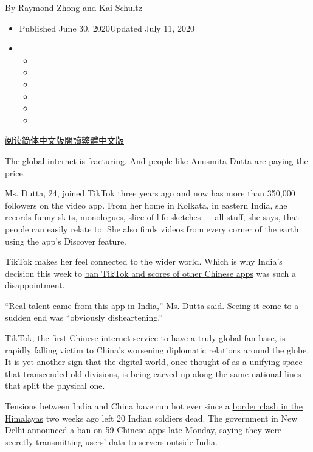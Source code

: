 By \href{https://www.nytimes.com/by/raymond-zhong}{Raymond Zhong} and
\href{https://www.nytimes.com/by/kai-schultz}{Kai Schultz}

\begin{itemize}
\item
  Published June 30, 2020Updated July 11, 2020
\item
  \begin{itemize}
  \item
  \item
  \item
  \item
  \item
  \item
  \end{itemize}
\end{itemize}

\href{https://cn.nytimes.com/technology/20200701/india-china-tiktok/}{阅读简体中文版}\href{https://cn.nytimes.com/technology/20200701/india-china-tiktok/zh-hant/}{閱讀繁體中文版}

The global internet is fracturing. And people like Anusmita Dutta are
paying the price.

Ms. Dutta, 24, joined TikTok three years ago and now has more than
350,000 followers on the video app. From her home in Kolkata, in eastern
India, she records funny skits, monologues, slice-of-life sketches ---
all stuff, she says, that people can easily relate to. She also finds
videos from every corner of the earth using the app's Discover feature.

TikTok makes her feel connected to the wider world. Which is why India's
decision this week to
\href{https://www.nytimes.com/2020/06/29/world/asia/tik-tok-banned-india-china.html}{ban
TikTok and scores of other Chinese apps} was such a disappointment.

``Real talent came from this app in India,'' Ms. Dutta said. Seeing it
come to a sudden end was ``obviously disheartening.''

TikTok, the first Chinese internet service to have a truly global fan
base, is rapidly falling victim to China's worsening diplomatic
relations around the globe. It is yet another sign that the digital
world, once thought of as a unifying space that transcended old
divisions, is being carved up along the same national lines that split
the physical one.

Tensions between India and China have run hot ever since a
\href{https://www.nytimes.com/2020/06/16/world/asia/indian-china-border-clash.html}{border
clash in the Himalayas} two weeks ago left 20 Indian soldiers dead. The
government in New Delhi announced
\href{https://pib.gov.in/PressReleasePage.aspx?PRID=1635206}{a ban on 59
Chinese apps} late Monday, saying they were secretly transmitting users'
data to servers outside India.

